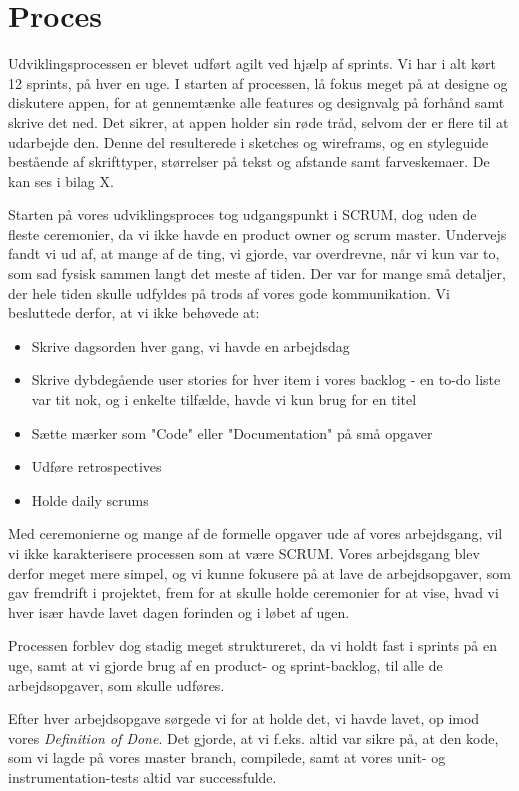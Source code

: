\section{Proces}
Udviklingsprocessen er blevet udført agilt ved hjælp af sprints. Vi har i alt kørt 12 sprints, på hver en uge. I starten af processen, lå fokus meget på at designe og diskutere appen, for at gennemtænke alle features og designvalg på forhånd samt skrive det ned. Det sikrer, at appen holder sin røde tråd, selvom der er flere til at udarbejde den. Denne del resulterede i sketches og wireframs, og en styleguide bestående af skrifttyper, størrelser på tekst og afstande samt farveskemaer. De kan ses i bilag X.

Starten på vores udviklingsproces tog udgangspunkt i SCRUM, dog uden de fleste ceremonier, da vi ikke havde en product owner og scrum master. Undervejs fandt vi ud af, at mange af de ting, vi gjorde, var overdrevne, når vi kun var to, som sad fysisk sammen langt det meste af tiden. Der var for mange små detaljer, der hele tiden skulle udfyldes på trods af vores gode kommunikation. Vi besluttede derfor, at vi ikke behøvede at:

\begin{itemize}
   \item Skrive dagsorden hver gang, vi havde en arbejdsdag
   \item Skrive dybdegående user stories for hver item i vores backlog - en to-do liste var tit nok, og i enkelte tilfælde, havde vi kun brug for en titel
   \item Sætte mærker som "Code" eller "Documentation" på små opgaver
    \item Udføre retrospectives
    \item Holde daily scrums
\end{itemize}

Med ceremonierne og mange af de formelle opgaver ude af vores arbejdsgang, vil vi ikke karakterisere processen som at være SCRUM.
Vores arbejdsgang blev derfor meget mere simpel, og vi kunne fokusere på at lave de arbejdsopgaver, som gav fremdrift i projektet, frem for at skulle holde ceremonier for at vise, hvad vi hver især havde lavet dagen forinden og i løbet af ugen. 

Processen forblev dog stadig meget struktureret, da vi holdt fast i sprints på en uge, samt at vi gjorde brug af en product- og sprint-backlog, til alle de arbejdsopgaver, som skulle udføres. 

Efter hver arbejdsopgave sørgede vi for at holde det, vi havde lavet, op imod vores \textit{Definition of Done}. Det gjorde, at vi f.eks. altid var sikre på, at den kode, som vi lagde på vores master branch, compilede, samt at vores unit- og instrumentation-tests altid var successfulde.

